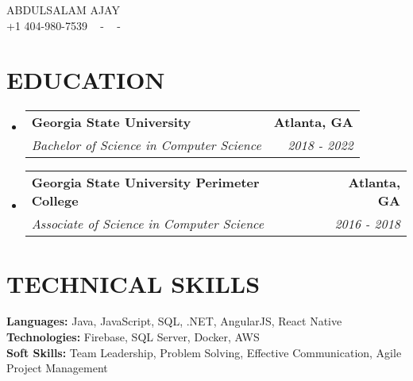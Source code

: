 \documentclass[letterpaper,11pt]{article}
\makeatletter
\newcommand{\resumeSubheading}[4]{
  \vspace{-2pt}\item
    \begin{tabular*}{1.0\textwidth}[t]{l@{\extracolsep{\fill}}r}
      \textbf{\large#1} & \textbf{\small #2} \\
      \textit{\large#3} & \textit{\small #4} \\
      
    \end{tabular*}\vspace{-7pt}
}
\newcommand{\resumeSubHeadingListStart}{\begin{itemize}[leftmargin=0.0in, label={}]}
\newcommand{\resumeSubHeadingListEnd}{\end{itemize}}
\makeatother
\begin{document}
\begin{center}
    {\Huge ABDULSALAM AJAY} \\ \vspace{2pt} 
    {+1 404-980-7539} ~ 
    \small{-}
    \href{mailto:dev.aj@icloud.com}{\color{blue}{dev.aj@icloud.com}} ~ 
    \small{-}
    \href{https://github.com/Sudoaj}{ \color{blue}{github.com/Sudoaj}} ~
    \vspace{-7pt}
\end{center}

\section{\color{airforceblue}EDUCATION}
  \resumeSubHeadingListStart
    \resumeSubheading
      {Georgia State University}{Atlanta, GA}
      {Bachelor of Science in Computer Science}{2018 - 2022}
    \resumeSubheading
      {Georgia State University Perimeter College}{Atlanta, GA}
      {Associate of Science in Computer Science}{2016 - 2018}
  \resumeSubHeadingListEnd
  
\section{\color{airforceblue}TECHNICAL SKILLS}
 \begin{itemize}[leftmargin=0in, label={}]
    \small{\item{
     \textbf{Languages:}{ Java, JavaScript, SQL, .NET, AngularJS, React Native} \\
     \textbf{Technologies:}{ Firebase, SQL Server, Docker, AWS} \\
     \textbf{Soft Skills:}{ Team Leadership, Problem Solving, Effective Communication, Agile Project Management} \\
     }}
 \end{itemize}
 
\end{document}

